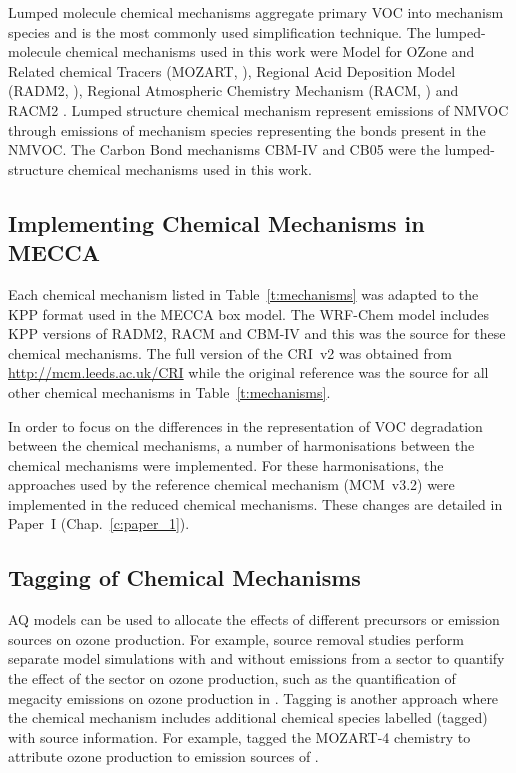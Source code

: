 Lumped molecule chemical mechanisms aggregate primary VOC into mechanism species and is the most commonly used simplification technique.
The lumped-molecule chemical mechanisms used in this work were Model for OZone and Related chemical Tracers (MOZART, \citet{Emmons:2010}), Regional Acid Deposition Model (RADM2, \citet{Stockwell:1990}), Regional Atmospheric Chemistry Mechanism (RACM, \citet{Stockwell:1997}) and RACM2 \citet{Goliff:2013}.
Lumped structure chemical mechanism represent emissions of NMVOC through emissions of mechanism species representing the bonds present in the NMVOC.
The Carbon Bond mechanisms CBM-IV \citep{Gery:1989} and CB05 \citep{Yarwood:2005} were the lumped-structure chemical mechanisms used in this work.

\subsection{Implementing Chemical Mechanisms in MECCA} \label{s:mechanisms_MECCA}
Each chemical mechanism listed in Table~\ref{t:mechanisms} was adapted to the KPP format used in the MECCA box model.
The WRF-Chem model \citep{Grell:2005} includes KPP versions of RADM2, RACM and CBM-IV and this was the source for these chemical mechanisms.
The full version of the CRI~v2 was obtained from \mbox{\url{http://mcm.leeds.ac.uk/CRI}} while the original reference was the source for all other chemical mechanisms in Table~\ref{t:mechanisms}.

In order to focus on the differences in the representation of VOC degradation between the chemical mechanisms, a number of harmonisations between the chemical mechanisms were implemented.
For these harmonisations, the approaches used by the reference chemical mechanism (MCM~v3.2) were implemented in the reduced chemical mechanisms.
These changes are detailed in Paper~I (Chap.~\ref{c:paper_1}). 

\subsection{Tagging of Chemical Mechanisms} \label{s:tagging}
AQ models can be used to allocate the effects of different precursors or emission sources on ozone production.
For example, source removal studies perform separate model simulations with and without emissions from a sector to quantify the effect of the sector on ozone production, such as the quantification of megacity emissions on ozone production in \citet{Butler:2009}.
Tagging is another approach where the chemical mechanism includes additional chemical species labelled (tagged) with source information.
For example, \citet{Emmons:2012} tagged the MOZART-4 chemistry to attribute ozone production to emission sources of .

